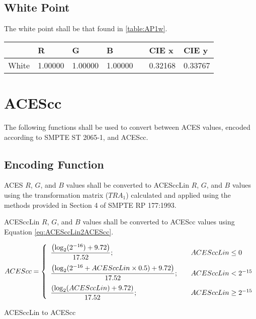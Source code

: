 \subsection{White Point}
The white point shall be that found in \autoref{table:AP1w}.

\begin{center}
\begin{tabularx}{4.5in}{XlllXll}
        & R       & G       & B       & & CIE x & CIE y \\ \hline
White   & 1.00000 & 1.00000 & 1.00000 & & 0.32168 & 0.33767 \\
\end{tabularx}
\label{table:AP1w}
\end{center}

\newpage
\section{ACEScc}
\label{sec:ACEScc}
The following functions shall be used to convert between ACES values, encoded according to SMPTE ST 2065-1, and ACEScc.

\subsection{Encoding Function}
ACES $R$, $G$, and $B$ values shall be converted to ACESccLin $R$, $G$, and $B$ values using the transformation matrix ($TRA_{1}$) calculated and applied using the methods provided in Section 4 of SMPTE RP 177:1993.

ACESccLin $R$, $G$, and $B$ values shall be converted to ACEScc values using Equation \ref{eq:ACESccLin2ACEScc}.

\begin{floatequ} 
\begin{equation} 
    ACEScc = \left\{ 
    \begin{array}{l l }
        \dfrac{\left(\log_{2}(2^{-16}) + 9.72\right)}{17.52};    & \quad ACESccLin \leq 0 \\[10pt]
        \dfrac{\left(\log_{2}(2^{-16} + ACESccLin \times 0.5) + 9.72\right)}{17.52};        & \quad ACESccLin < 2^{-15} \\[10pt]
        \dfrac{\left(\log_{2}(ACESccLin) + 9.72\right)}{17.52}; & \quad ACESccLin \geq 2^{-15} \\    
    \end{array} \right.
\end{equation}
\caption{ACESccLin to ACEScc}
\label{eq:ACESccLin2ACEScc}
\end{floatequ}


